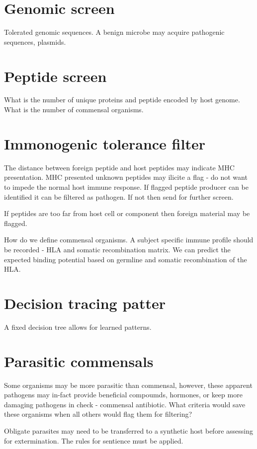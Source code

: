 \documentclass[preprint,11pt,fleqn]{elsarticle}
\begin{document}
\section{Genomic screen}
Tolerated genomic sequences.
A benign microbe may acquire pathogenic sequences, plasmids.

\section{Peptide screen}

What is the number of unique proteins and peptide encoded by host genome.
What is the number of commensal organisms.


\section{Immonogenic tolerance filter}
The distance between foreign peptide and host peptides may indicate MHC presentation.
MHC presented unknown peptides may ilicite a flag - do not want to impede the normal host immune response. 
If flagged peptide producer can be identified it can be filtered as pathogen.
If not then send for further screen.

If peptides are too far from host cell or component then foreign material may be flagged.

How do we define commensal organisms. 
A subject specific immune profile should be recorded - HLA and somatic recombination matrix. 
We can predict the expected binding potential based on germline and somatic recombination of the HLA. 

\section{Decision tracing patter}
A fixed decision tree allows for learned patterns.


\section{Parasitic commensals}
Some organisms may be more parasitic than commensal, however, these apparent
pathogens may in-fact provide beneficial compoumds, hormones, or keep more damaging pathogens in check - commensal antibiotic. 
What criteria would save these organisms when all others would flag them for filtering?

Obligate parasites may need to be transferred to a synthetic host before assessing for extermination. 
The rules for sentience must be applied. 
\end{document}
